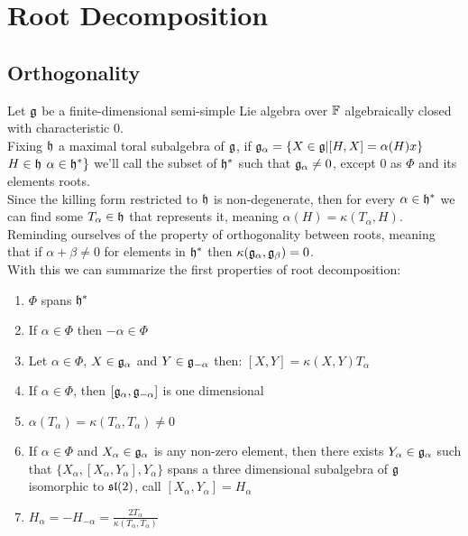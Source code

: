 \section{Root Decomposition}
\subsection*{Orthogonality}
Let $\mathfrak{g}$ be a finite-dimensional semi-simple Lie algebra over $\mathbb{F}$ algebraically closed with characteristic $0$.\\
Fixing $\mathfrak{h}$ a maximal toral subalgebra of $\mathfrak{g}$, if $\mathfrak{g}_\alpha = \{X \in \mathfrak{g} | [H,X]=\alpha(H)x\}$  $H \in \mathfrak{h}$  $\alpha \in \mathfrak{h}^*\}$ we'll call the subset of $\mathfrak{h}^*$ such that $\mathfrak{g}_\alpha \not=0$, except $0$ as $\Phi$ and its elements roots. \\
Since the killing form restricted to $\mathfrak{h}$ is non-degenerate, then for every $\alpha \in \mathfrak{h}^*$ we can find some $T_\alpha \in \mathfrak{h}$ that represents it, meaning $\alpha(H)=\kappa(T_\alpha,H)$.\\
Reminding ourselves of the property of orthogonality between roots, meaning that if $\alpha+\beta \not=0$ for elements in $\mathfrak{h}^*$ then $\kappa(\mathfrak{g}_\alpha,\mathfrak{g}_\beta)=0$.\\
With this we can summarize the first properties of root decomposition:
\begin{prop}
	\begin{enumerate}[label=(\alph*)]
		\item $\Phi$ spans $\mathfrak{h}^*$
		\item If $\alpha \in \Phi$ then $-\alpha \in \Phi$
		\item Let $\alpha \in \Phi$, $X \in \mathfrak{g}_\alpha$ and $Y \in \mathfrak{g}_{-\alpha}$ then: $[X,Y]=\kappa(X,Y)T_\alpha$
		\item If $\alpha \in \Phi$, then $[\mathfrak{g}_\alpha,\mathfrak{g}_{-\alpha}]$ is one dimensional
		\item $\alpha(T_\alpha)=\kappa(T_\alpha,T_\alpha)\not=0$
		\item If $\alpha \in \Phi$ and $X_\alpha \in \mathfrak{g}_\alpha$ is any non-zero element, then there exists $Y_\alpha \in \mathfrak{g}_\alpha$ such that $\{X_\alpha,[X_\alpha,Y_\alpha],Y_\alpha\}$ spans a three dimensional subalgebra of $\mathfrak{g}$ isomorphic to $\mathfrak{sl}(2)$, call $[X_\alpha,Y_\alpha]=H_\alpha$
		\item $H_\alpha = -H_{-\alpha} = \frac{2T_\alpha}{\kappa(T_\alpha,T_\alpha)}$ 
	\end{enumerate}
	\label{Orthogonality}
\end{prop}

